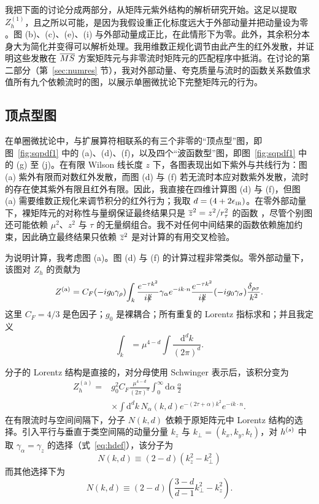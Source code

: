 我把下面的讨论分成两部分，从矩阵元紫外结构的解析研究开始。这足以提取 $Z_h^{(1)}$，且之所以可能，是因为我假设重正化标度远大于外部动量并把动量设为零 \cite{Ishikawa:2016znu}。图 (b)、(c)、(e)、(i) 与外部动量成正比，在此情形下为零。此外，其余积分本身大为简化并变得可以解析处理。我用维数正规化调节由此产生的红外发散，并证明这些发散在 $\overline{MS}$ 方案矩阵元与非零流时矩阵元的匹配程序中抵消。在讨论的第二部分（第~\ref{sec:numres} 节），我对外部动量、夸克质量与流时的函数关系数值求值所有九个依赖流时的图，以展示单圈微扰论下完整矩阵元的行为。


\subsection{顶点型图}

在单圈微扰论中，与扩展算符相联系的有三个非零的``顶点型''图，即图~\ref{fig:sqpdf1} 中的 (a)、(d)、(f)，以及四个``波函数型''图，即图~\ref{fig:sqpdf1} 中的 (g) 至 (j)。在有限 Wilson 线长度 $z$ 下，各图表现出如下紫外与共线行为：图 (a) 紫外有限而对数红外发散，而图 (d) 与 (f) 若无流时本应对数紫外发散，流时的存在使其紫外有限且红外有限。因此，我直接在四维计算图 (d) 与 (f)，但图 (a) 需要维数正规化来调节积分的红外行为；我取 $d = (4+2\epsilon_{\scriptscriptstyle\mathrm{IR}})$。在零外部动量下，裸矩阵元的对称性与量纲保证最终结果只是 $\overline{z}^2=z^2/r_\tau^2$ 的函数 \cite{Radyushkin:2016hsy}，尽管个别图还可能依赖 $\mu^2$、$z^2$ 与 $\tau$ 的无量纲组合。我不对任何中间结果的函数依赖施加约束，因此确立最终结果只依赖 $\overline{z}^2$ 是对计算的有用交叉检验。

为说明计算，我考虑图 (a)。图 (d) 与 (f) 的计算过程非常类似。零外部动量下，该图对 $Z_h$ 的贡献为
\begin{equation}
Z^{\mathrm{(a)}} = C_F (-ig_0\gamma_\rho)\! \int_k \frac{e^{-\tau k^2}}{ik\!\!\!/}\gamma_\alpha e^{-ik\cdot n} \frac{e^{-\tau k^2}}{ik\!\!\!/}(-ig_0\gamma_\sigma)\frac{\delta_{\rho\sigma}}{k^2}.
\end{equation}
这里 $C_F = 4/3$ 是色因子；$g_0$ 是裸耦合；所有重复的 Lorentz 指标求和；并且我定义
\begin{equation}
\int_k = \mu^{4-d}\int \frac{\mathrm{d}^dk}{(2\pi)^d}.
\end{equation}

分子的 Lorentz 结构是直接的，对分母使用 Schwinger 表示后，该积分变为
\begin{align}\label{eq:hma}
Z_h^{\mathrm{(a)}} = {} &  g_0^2C_F \frac{\mu^{4-d}}{(2\pi)^d} \int_0^\infty\mathrm{d}\alpha\,\frac{\alpha}{2} \nonumber \\
& \times \int \mathrm{d}^dk\, N_\alpha(k,d)e^{-(2\tau+\alpha) k^2} e^{-ik\cdot n}.
\end{align}
在有限流时与空间间隔下，分子 $N(k,d)$ 依赖于原矩阵元中 Lorentz 结构的选择。引入平行与垂直于类空间隔的动量分量 $k_z$ 与 $k_\perp=(k_x,k_y,k_t)$，对 $h^{(s)}$ 中取 $\gamma_\alpha = \gamma_z$ 的选择（式~\eqref{eq:hdef}），该分子为
\begin{equation}
N(k,d) \equiv (2-d)(k_z^2-k_\perp^2)
\end{equation}
而其他选择下为
\begin{equation}
N(k,d) \equiv (2-d)\left(\displaystyle\frac{3-d}{d-1}k_\perp^2 - k_z^2\right).
\end{equation}


